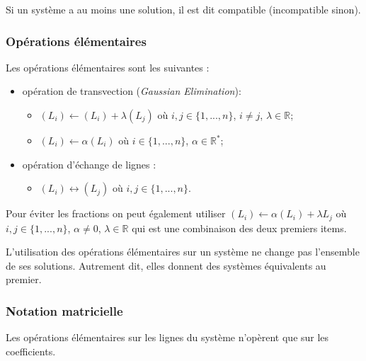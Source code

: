\begin{defi}
Si un système a au moins une solution, il est dit compatible (incompatible sinon).
\end{defi}


\subsubsection{Opérations élémentaires}
\begin{defi}
Les opérations élémentaires sont les suivantes :
\begin{itemize}
\item opération de transvection (\textit{Gaussian Elimination}): 
\begin{itemize}
\item $(L_i)\leftarrow (L_i)+\lambda (L_j)$ où $i,j\in \{1,...,n\}$, $i\neq j$, $\lambda \in \mathbb{R}$;
\item $(L_i)\leftarrow \alpha (L_i)$ où $i\in \{1,...,n\}$, $\alpha \in \mathbb{R}^*$;
\end{itemize}
\item opération d'échange de lignes : 
\begin{itemize}
\item $(L_i)\leftrightarrow  (L_j)$ où $i,j\in \{1,...,n\}$. 
\end{itemize}
\end{itemize}
\end{defi}

\begin{remarque}
Pour éviter les fractions on peut également utiliser $(L_i)\leftarrow \alpha (L_i) + \lambda L_j$ où $i,j\in \{1,...,n\}$, $\alpha \neq 0$, $\lambda \in \mathbb{R}$ qui est une combinaison des deux premiers items.
\end{remarque}

\begin{proposition}
L'utilisation des opérations élémentaires sur un système ne change pas l'ensemble de ses solutions. Autrement dit, elles donnent des systèmes équivalents au premier.
\end{proposition}

\subsubsection{Notation matricielle}
\begin{remarque}
Les opérations élémentaires sur les lignes du système n'opèrent que sur les coefficients. 
\end{remarque}


